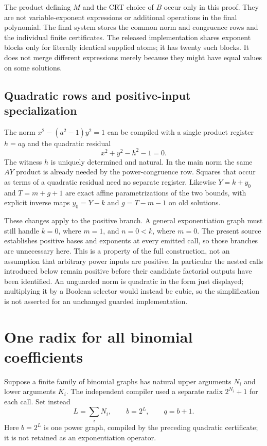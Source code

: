 The product defining $M$ and the CRT choice of $B$ occur only in this
proof.  They are not variable-exponent expressions or additional
operations in the final polynomial.  The final system stores the
common norm and congruence rows and the individual finite certificates.
The released implementation shares exponent blocks only for literally
identical supplied atoms; it has twenty such blocks.  It does not merge
different expressions merely because they might have equal values on
some solutions.

\subsection{Quadratic rows and positive-input specialization}

The norm $x^2-(a^2-1)y^2=1$ can be compiled with a single product
register $h=ay$ and the quadratic residual
\[
 x^2+y^2-h^2-1=0.
\]
The witness $h$ is uniquely determined and natural.  In the main norm
the same $AY$ product is already needed by the power-congruence row.
Squares that occur as terms of a quadratic residual need no separate
register.  Likewise $Y=k+y_0$ and $T=m+g+1$ are exact affine
parametrizations of the two bounds, with explicit inverse maps
$y_0=Y-k$ and $g=T-m-1$ on old solutions.

These changes apply to the positive branch.  A general exponentiation
graph must still handle $k=0$, where $m=1$, and $n=0<k$, where $m=0$.
The present source establishes positive bases and exponents at every
emitted call, so those branches are unnecessary here.  This is a property
of the full construction, not an assumption that arbitrary power inputs
are positive.  In particular the nested calls introduced below remain
positive before their candidate factorial outputs have been identified.
An unguarded norm is quadratic in the form just displayed; multiplying
it by a Boolean selector would instead be cubic, so the simplification
is not asserted for an unchanged guarded implementation.

\section{One radix for all binomial coefficients}
\label{sec:shared-radix}

Suppose a finite family of binomial graphs has natural upper arguments
$N_i$ and lower arguments $K_i$.  The independent compiler used a
separate radix $2^{N_i}+1$ for each call.  Set instead
\[
 L=\sum_i N_i,\qquad b=2^L,\qquad q=b+1.
\]
Here $b=2^L$ is one power graph, compiled by the preceding quadratic
certificate; it is not retained as an exponentiation operator.

